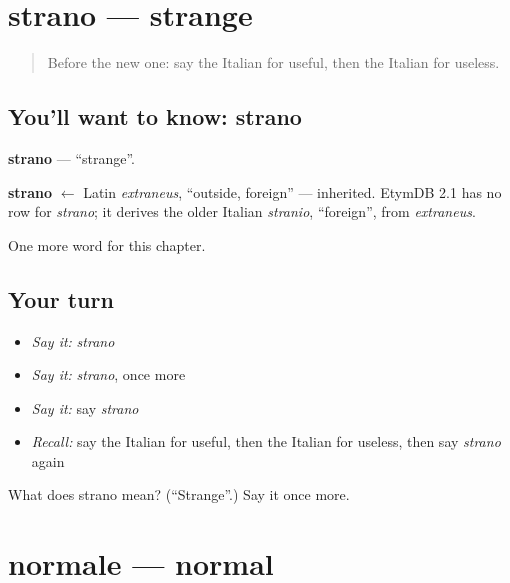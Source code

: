 \section[strano]{strano — strange}

\label{lesson:IT-C190-strano}



\begin{quote}
Before the new one: say the Italian for useful, then the Italian for useless.
\end{quote}

\subsection*{You'll want to know: strano}
\textbf{strano} — \textquotedblleft{}strange\textquotedblright{}.

\begin{cousinweb}
\textbf{strano} $\leftarrow$ Latin \emph{extraneus}, \textquotedblleft{}outside, foreign\textquotedblright{} — inherited. EtymDB 2.1 has no row for \emph{strano}; it derives the older Italian \emph{stranio}, \textquotedblleft{}foreign\textquotedblright{}, from \emph{extraneus}.
\end{cousinweb}

\begin{grammarlens}[title={What you've built}]
One more word for this chapter.
\end{grammarlens}

\subsection*{Your turn}
\begin{itemize}
\raggedright
  \item \emph{Say it:} \emph{strano}
  \item \emph{Say it:} \emph{strano}, once more
  \item \emph{Say it:} say \emph{strano}
  \item \emph{Recall:} say the Italian for useful, then the Italian for useless, then say \emph{strano} again
\end{itemize}

\begin{tcolorbox}[breakable,colback=teal!4,colframe=teal!35!black,title={Before you move on}]
What does strano mean? (\textquotedblleft{}Strange\textquotedblright{}.) Say it once more.
\end{tcolorbox}
\section[normale]{normale — normal}

